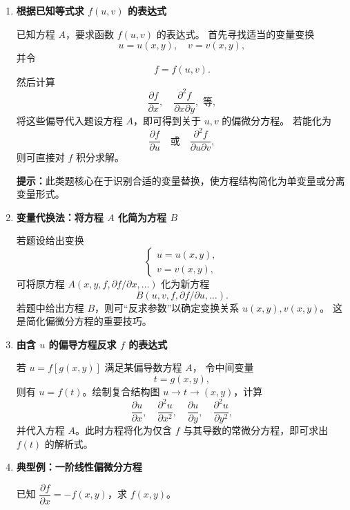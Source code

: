\begin{enumerate}
    \item \textbf{根据已知等式求 $f(u,v)$ 的表达式}

          已知方程 $A$，要求函数 $f(u,v)$ 的表达式。
          首先寻找适当的变量变换
          \[
              u = u(x,y), \quad v = v(x,y),
          \]
          并令
          \[
              f = f(u,v).
          \]
          然后计算
          \[
              \frac{\partial f}{\partial x}, \quad \frac{\partial^2 f}{\partial x \partial y}, \text{ 等},
          \]
          将这些偏导代入题设方程 $A$，即可得到关于 $u,v$ 的偏微分方程。
          若能化为
          \[
              \frac{\partial f}{\partial u} \quad \text{或} \quad \frac{\partial^2 f}{\partial u \partial v},
          \]
          则可直接对 $f$ 积分求解。

          \textbf{提示：}此类题核心在于识别合适的变量替换，使方程结构简化为单变量或分离变量形式。

    \item \textbf{变量代换法：将方程 $A$ 化简为方程 $B$}

          若题设给出变换
          \[
              \begin{cases}
                  u = u(x,y), \\
                  v = v(x,y),
              \end{cases}
          \]
          可将原方程 $A(x,y,f,\partial f/\partial x,\ldots)$ 化为新方程
          \[
              B(u,v,f,\partial f/\partial u,\ldots).
          \]
          若题中给出方程 $B$，则可“反求参数”以确定变换关系 $u(x,y),v(x,y)$。
          这是简化偏微分方程的重要技巧。

    \item \textbf{由含 $u$ 的偏导方程反求 $f$ 的表达式}

          若 $u = f[g(x,y)]$ 满足某偏导数方程 $A$，
          令中间变量
          \[
              t = g(x,y),
          \]
          则有 $u = f(t)$。绘制复合结构图 $u \rightarrow t \rightarrow (x,y)$，计算
          \[
              \frac{\partial u}{\partial x}, \quad \frac{\partial^2 u}{\partial x^2}, \quad \frac{\partial u}{\partial y}, \quad \frac{\partial^2 u}{\partial y^2},
          \]
          并代入方程 $A$。此时方程将化为仅含 $f$ 与其导数的常微分方程，即可求出 $f(t)$ 的解析式。

    \item \textbf{典型例：一阶线性偏微分方程}

          \begin{example}{}{}
              已知 $\dfrac{\partial f}{\partial x} = -f(x,y)$，求 $f(x,y)$。
          \end{example}


\end{enumerate}

